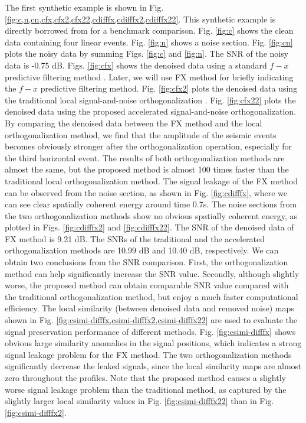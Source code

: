 The first synthetic example is shown in Fig. \ref{fig:c,n,cn,cfx,cfx2,cfx22,cdifffx,cdifffx2,cdifffx22}. This synthetic example is directly borrowed from \cite{yangkang2015ortho} for a benchmark comparison. Fig. \ref{fig:c} shows the clean data containing four linear events. Fig. \ref{fig:n} shows a noise section. Fig. \ref{fig:cn} plots the noisy data by summing Figs. \ref{fig:c} and \ref{fig:n}. The SNR of the noisy data is -0.75 dB. Figs. \ref{fig:cfx} shows the denoised data using a standard $f-x$ predictive filtering method \cite{canales1984}. Later, we will use FX method for briefly indicating the $f-x$ predictive filtering method. Fig. \ref{fig:cfx2} plots the denoised data using the traditional local signal-and-noise orthogonalization \cite{yangkang2015ortho}. Fig. \ref{fig:cfx22} plots the denoised data using the proposed accelerated signal-and-noise orthogonalization. By comparing the denoised data between the FX method and the local orthogonalization method, we find that the amplitude of the seismic events becomes obviously stronger after the orthogonalization operation, especially for the third horizontal event. The results of both orthogonalization methods are almost the same, but the proposed method is almost 100 times faster than the traditional local orthogonalization method. The signal leakage of the FX method can be observed from the noise section, as shown in Fig. \ref{fig:cdifffx}, where we can see clear spatially coherent energy around time 0.7s. The noise sections from the two orthogonalization methods show no obvious spatially coherent energy, as plotted in Figs. \ref{fig:cdifffx2} and \ref{fig:cdifffx22}. The SNR of the denoised data of FX method is 9.21 dB. The SNRs of the traditional and the accelerated orthogonalization methods are 10.99 dB and 10.40 dB, respectively. We can obtain two conclusions from the SNR comparison. First, the orthogonalization method can help significantly increase the SNR value. Secondly, although slightly worse, the proposed method can obtain comparable SNR value compared with the traditional orthogonalization method, but enjoy a much faster computational efficiency. The local similarity (between denoised data and removed noise) maps shown in Fig. \ref{fig:csimi-difffx,csimi-difffx2,csimi-difffx22} are used to evaluate the signal preservation performance of different methods. Fig. \ref{fig:csimi-difffx} shows obvious large similarity anomalies in the signal positions, which indicates a strong signal leakage problem for the FX method. The two orthogonalization methods significantly decrease the leaked signals, since the local similarity maps are almost zero throughout the profiles. Note that the proposed method causes a slightly worse signal leakage problem than the traditional method, as captured by the slightly larger local similarity values in Fig. \ref{fig:csimi-difffx22} than in Fig. \ref{fig:csimi-difffx2}. 




